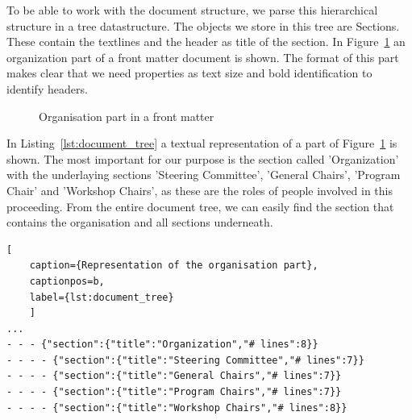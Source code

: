 \documentclass{ou-report}
\begin{document}
To be able to work with the document structure, we parse this hierarchical
structure in a tree datastructure. The objects we store in this tree are
Sections. These contain the textlines and the header as title of the section. 
In Figure~\ref{fig:front_matter_organisation_section} an organization part of 
a front matter document is shown. The format of this part makes clear that we 
need properties as text size and bold identification to identify headers. 

\begin{figure}[ht]
    \centering
    \caption{Organisation part in a front matter}
    \label{fig:front_matter_organisation_section}
\end{figure}


In
Listing~\ref{lst:document_tree} a textual representation of a part of
Figure~\ref{fig:front_matter_organisation_section} is shown.
The most important for our purpose is the section called 'Organization' with
the underlaying sections 'Steering Committee', 'General Chairs', 'Program Chair'
and 'Workshop Chairs', as these are the roles of people involved in this
proceeding. From the entire document tree, we can easily find the section that contains the
organisation and all sections underneath.

\begin{minipage}{\linewidth}
\begin{lstlisting}[
    caption={Representation of the organisation part},
    captionpos=b,
    label={lst:document_tree}
    ]
...
- - - {"section":{"title":"Organization","# lines":8}}
- - - - {"section":{"title":"Steering Committee","# lines":7}}
- - - - {"section":{"title":"General Chairs","# lines":7}}
- - - - {"section":{"title":"Program Chairs","# lines":7}}
- - - - {"section":{"title":"Workshop Chairs","# lines":8}}
\end{lstlisting}
\end{minipage}

\end{document}
